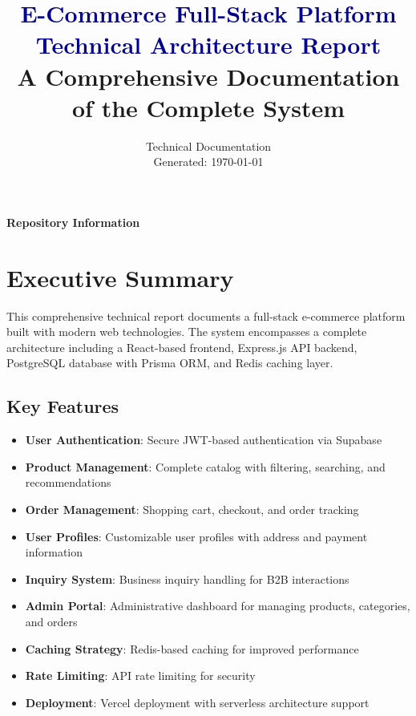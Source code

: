 \documentclass[12pt,a4paper]{report}
\title{
    \vspace*{2cm}
    {\Huge \textbf{\textcolor{darkblue}{E-Commerce Full-Stack Platform}}} \\
    \vspace{0.5cm}
    {\LARGE \textcolor{darkblue}{Technical Architecture Report}} \\
    \vspace{1cm}
    {\large A Comprehensive Documentation of the Complete System}
}
\author{
    \vspace{1cm}
    {\Large Technical Documentation} \\
    Generated: \today
}
\date{}
\begin{document}
\maketitle
\thispagestyle{empty}
\vspace*{3cm}

\begin{center}
    \Large \textbf{Repository Information}
    
    \vspace{1cm}
\end{center}

\newpage

\clearpage
\tableofcontents
\clearpage

\chapter{Executive Summary}

This comprehensive technical report documents a full-stack e-commerce platform built with modern web technologies. The system encompasses a complete architecture including a React-based frontend, Express.js API backend, PostgreSQL database with Prisma ORM, and Redis caching layer.

\section{Key Features}

\begin{itemize}
    \item \textbf{User Authentication}: Secure JWT-based authentication via Supabase
    \item \textbf{Product Management}: Complete catalog with filtering, searching, and recommendations
    \item \textbf{Order Management}: Shopping cart, checkout, and order tracking
    \item \textbf{User Profiles}: Customizable user profiles with address and payment information
    \item \textbf{Inquiry System}: Business inquiry handling for B2B interactions
    \item \textbf{Admin Portal}: Administrative dashboard for managing products, categories, and orders
    \item \textbf{Caching Strategy}: Redis-based caching for improved performance
    \item \textbf{Rate Limiting}: API rate limiting for security
    \item \textbf{Deployment}: Vercel deployment with serverless architecture support
\end{itemize}
\end{document}
